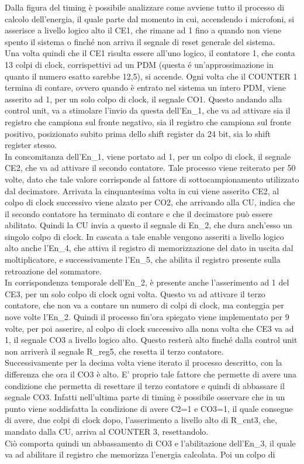 \documentclass[a4paper, titlepage]{article}
\begin{document}
Dalla figura del timing è possibile analizzare come avviene tutto il processo di calcolo dell'energia, il quale parte dal momento in cui, accendendo i microfoni, si asserisce a livello logico alto il CE1, che rimane ad 1 fino a quando non viene spento il sistema o finché non arriva il segnale di reset generale del sistema.\\ Una volta quindi che il CE1 risulta essere all'uno logico, il contatore 1, che conta 13 colpi di clock, corrispettivi ad un PDM (questa é un'approssimazione in quanto il numero esatto sarebbe 12,5), si accende. Ogni volta che il COUNTER 1 termina di contare, ovvero quando è entrato nel sistema un intero PDM, viene asserito ad 1, per un solo colpo di clock, il segnale CO1. Questo andando alla control unit, va a stimolare l'invio da questa dell'En\_1, che va ad attivare sia il registro che campiona sul fronte negativo, sia il registro che campiona sul fronte positivo, posizionato subito prima dello shift register da 24 bit, sia lo shift register stesso. \\In concomitanza dell'En\_1, viene portato ad 1, per un colpo di clock, il segnale CE2, che va ad attivare il secondo contatore. Tale processo viene reiterato per 50 volte, dato che tale valore corrisponde al fattore di sottocampionamento utilizzato dal decimatore. Arrivata la cinquantesima volta in cui viene asserito CE2, al colpo di clock successivo viene alzato per CO2, che arrivando alla CU, indica che il secondo contatore ha terminato di contare e che il decimatore può essere abilitato. Quindi la CU invia a questo il segnale di En\_2, che dura anch'esso un singolo colpo di clock. In cascata a tale enable vengono asseriti a livello logico alto anche l'En\_4, che attiva il registro di memorizzazione del dato in uscita dal moltiplicatore, e successivamente l'En\_5, che abilita il registro presente sulla retroazione del sommatore.\\In corrispondenza temporale dell'En\_2, è presente anche l'asserimento ad 1 del CE3, per un solo colpo di clock ogni volta. Questo va ad attivare il terzo contatore, che non va a contare un numero di colpi di clock, ma conteggia per nove volte l'En\_2. Quindi il processo fin'ora spiegato viene implementato per 9 volte, per poi asserire, al colpo di clock successivo alla nona volta che CE3 va ad 1, il segnale CO3 a livello logico alto. Questo resterà alto finché dalla control unit non arriverà il segnale R\_reg5, che resetta il terzo contatore.\\Successivamente per la decima volta viene iterato il processo descritto, con la differenza che ora il CO3 è alto. E' proprio tale fattore che permette di avere una condizione che permetta di resettare il terzo contatore e quindi di abbassare il segnale CO3. Infatti nell'ultima parte di timing è possibile osservare che in un punto viene soddisfatta la condizione di avere C2=1 e CO3=1, il quale consegue di avere, due colpi di clock dopo, l'asserimento a livello alto di R\_cnt3, che, mandato dalla CU, arriva al COUNTER 3, resettandolo.\\Ciò comporta quindi un abbassamento di CO3 e l'abilitazione dell'En\_3, il quale va ad abilitare il registro che memorizza l'energia calcolata. Poi un colpo di 
\end{document}
